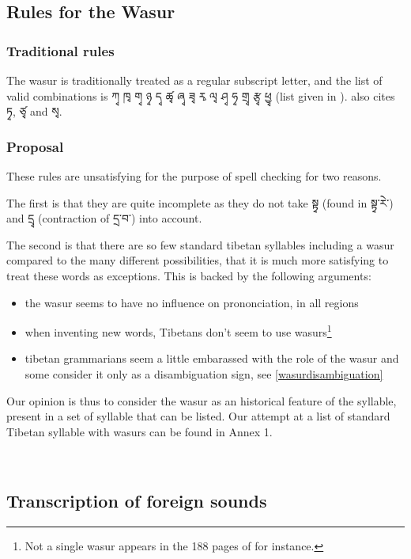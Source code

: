 \documentclass[%
a4paper,%
pagesize,%
12pt,%
parskip=off,%
bibliography=totoc,%
numbers=noenddot,%
DIV=12,%
twoside=semi,%
headings=normal%
]{scrartcl}
\begin{document}
\subsection{Rules for the Wasur}

\subsubsection*{Traditional rules}

­The wasur is traditionally treated as a regular subscript letter, and the list of valid combinations is ཀྭ ཁྭ གྭ ཉྭ དྭ ཚྭ ཞྭ ཟྭ རྭ ལྭ ཤྭ ཧྭ གྲྭ རྩྭ ཕྱྭ (list given in \cite{TsheshabGrammarTopics}). \cite{TournadreMST} also cites ཏྭ, ཙྭ and སྭ.

\subsubsection*{Proposal}

These rules are unsatisfying for the purpose of spell checking for two reasons.

The first is that they are quite incomplete as they do not take སྟྭ (found in སྟྭ་རེ་) and དྲྭ (contraction of དྲ་བ་) into account.

The second is that there are so few standard tibetan syllables including a wasur compared to the many different possibilities, that it is much more satisfying to treat these words as exceptions. This is backed by the following arguments:

\begin{itemize}
\item the wasur seems to have no influence on prononciation, in all regions
\item when inventing new words, Tibetans don't seem to use wasurs\footnote{Not a single wasur appears in the 188 pages of \cite{TseringIT} for instance.}
\item tibetan grammarians seem a little embarassed with the role of the wasur and some consider it only as a disambiguation sign, see \ref{wasurdisambiguation}
\end{itemize}

Our opinion is thus to consider the wasur as an historical feature of the syllable, present in a set of syllable that can be listed. Our attempt at a list of standard Tibetan syllable with wasurs can be found in Annex 1.

­\subsection{Transcription of foreign sounds}
\end{document}
